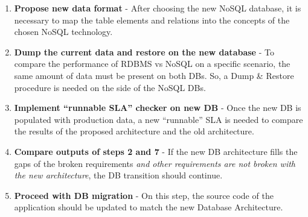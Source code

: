 \begin{enumerate}
   \item{\textbf{Propose new data format} - After choosing the new NoSQL database, it is necessary to map the table elements and relations into the concepts of the chosen NoSQL technology. }
   \item{\textbf{Dump the current data and restore on the new database} - To compare the performance of RDBMS vs NoSQL on a specific scenario, the same amount of data must be present on both DBs. So, a Dump \& Restore procedure is needed on the side of the NoSQL DBs.}
   \item{\textbf{Implement ``runnable SLA'' checker on new DB} - Once the new DB is populated with production data, a new ``runnable'' SLA is needed to compare the results of the proposed architecture and the old architecture}.
   \item{\textbf{Compare outputs of steps 2 and 7} - If the new DB architecture fills the gaps of the broken requirements \textit{and other requirements are not broken with the new architecture}, the DB transition should continue.}
   \item{\textbf{Proceed with DB migration} - On this step, the source code of the application should be updated to match the new Database Architecture. }
\end{enumerate}






